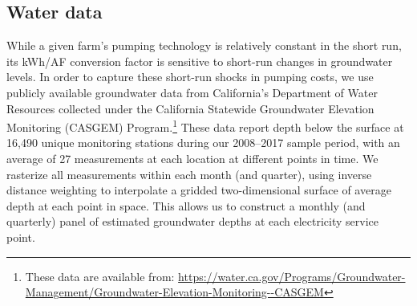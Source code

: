 \subsection{Water data}

While a given farm's pumping technology is relatively constant in the short run, its kWh/AF conversion factor is sensitive to short-run changes in groundwater levels. In order to capture these short-run shocks in pumping costs, we use publicly available groundwater data from California's Department of Water Resources collected under the California Statewide Groundwater Elevation Monitoring (CASGEM) Program.\footnote{
These data are available from: 
\url{https://water.ca.gov/Programs/Groundwater-Management/Groundwater-Elevation-Monitoring--CASGEM}
} 
These data report depth below the surface at 16,490 unique monitoring stations during our 2008--2017 sample period, with an average of 27 measurements at each location at different points in time. We rasterize all measurements within each month (and quarter), using inverse distance weighting to interpolate a gridded two-dimensional surface of average depth at each point in space. This allows us to construct a monthly (and quarterly) panel of estimated groundwater depths at each electricity service point.


